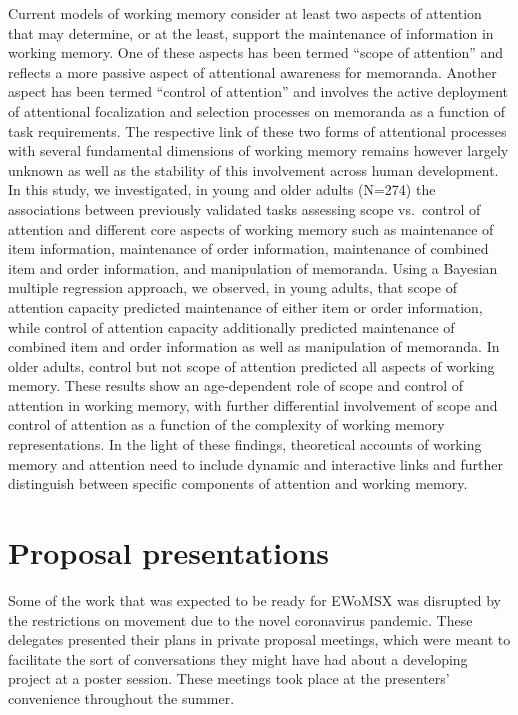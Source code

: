 \documentclass[12pt,]{book}
\begin{document}
Current models of working memory consider at least two aspects of attention that may determine, or at the least, support the maintenance of information in working memory. One of these aspects has been termed ``scope of attention'' and reflects a more passive aspect of attentional awareness for memoranda. Another aspect has been termed ``control of attention'' and involves the active deployment of attentional focalization and selection processes on memoranda as a function of task requirements. The respective link of these two forms of attentional processes with several fundamental dimensions of working memory remains however largely unknown as well as the stability of this involvement across human development. In this study, we investigated, in young and older adults (N=274) the associations between previously validated tasks assessing scope vs.~control of attention and different core aspects of working memory such as maintenance of item information, maintenance of order information, maintenance of combined item and order information, and manipulation of memoranda. Using a Bayesian multiple regression approach, we observed, in young adults, that scope of attention capacity predicted maintenance of either item or order information, while control of attention capacity additionally predicted maintenance of combined item and order information as well as manipulation of memoranda. In older adults, control but not scope of attention predicted all aspects of working memory. These results show an age-dependent role of scope and control of attention in working memory, with further differential involvement of scope and control of attention as a function of the complexity of working memory representations. In the light of these findings, theoretical accounts of working memory and attention need to include dynamic and interactive links and further distinguish between specific components of attention and working memory.

\hypertarget{proposal-presentations}{%
\chapter{Proposal presentations}\label{proposal-presentations}}

Some of the work that was expected to be ready for EWoMSX was disrupted by the restrictions on movement due to the novel coronavirus pandemic. These delegates presented their plans in private proposal meetings, which were meant to facilitate the sort of conversations they might have had about a developing project at a poster session. These meetings took place at the presenters' convenience throughout the summer.
\end{document}
